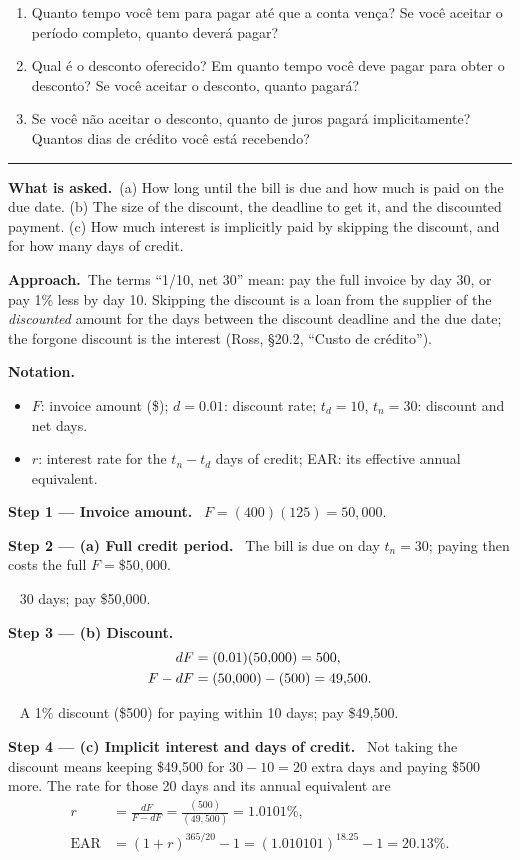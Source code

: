 \documentclass[11pt,a4paper]{article}
\newcommand{\notation}{\par\noindent\textbf{Notation.}}
\newcommand{\step}[2]{\par\medskip\noindent\textbf{Step #1 --- #2.}~}
\newcommand{\asked}{\par\medskip\noindent\textbf{What is asked.}~}
\newcommand{\approach}{\par\smallskip\noindent\textbf{Approach.}~}
\newcommand{\answer}[1]{\par\smallskip\noindent\fbox{\textbf{Answer #1.}}~}
\newcommand{\stmtend}{\par\endgroup\nopagebreak\noindent\rule{\linewidth}{0.4pt}\par\medskip}
\begin{document}
\begin{enumerate}
\def\labelenumi{\alph{enumi}.}
\item
  Quanto tempo você tem para pagar até que a conta vença? Se você aceitar o período completo, quanto
  deverá pagar?
\item
  Qual é o desconto oferecido? Em quanto tempo você deve pagar para obter o desconto? Se você
  aceitar o desconto, quanto pagará?
\item
  Se você não aceitar o desconto, quanto de juros pagará implicitamente? Quantos dias de crédito
  você está recebendo?
\end{enumerate}
\stmtend

\asked (a) How long until the bill is due and how much is paid on the due date. (b) The size of
the discount, the deadline to get it, and the discounted payment. (c) How much interest is
implicitly paid by skipping the discount, and for how many days of credit.

\approach The terms ``1/10, net 30'' mean: pay the full invoice by day 30, or pay 1\% less by day
10. Skipping the discount is a loan from the supplier of the \emph{discounted} amount for the
days between the discount deadline and the due date; the forgone discount is the interest (Ross,
\S20.2, ``Custo de cr\'edito'').

\notation
\begin{itemize}
  \item $F$: invoice amount (\$); $d = 0.01$: discount rate; $t_d = 10$, $t_n = 30$: discount and net days.
  \item $r$: interest rate for the $t_n - t_d$ days of credit; EAR: its effective annual equivalent.
\end{itemize}

\step{1}{Invoice amount}
$F = (400)(125) = 50{,}000$.

\step{2}{(a) Full credit period}
The bill is due on day $t_n = 30$; paying then costs the full $F = \$50{,}000$.

\answer{(a)} 30 days; pay \$50{,}000.

\step{3}{(b) Discount}
\begin{align}
  dF &= (0.01)(50{,}000) = 500, \notag\\
  F - dF &= (50{,}000) - (500) = 49{,}500. \notag
\end{align}

\answer{(b)} A 1\% discount (\$500) for paying within 10 days; pay \$49{,}500.

\step{4}{(c) Implicit interest and days of credit}
Not taking the discount means keeping \$49{,}500 for $30-10 = 20$ extra days and paying \$500
more. The rate for those 20 days and its annual equivalent are
\begin{align}
  r &= \frac{dF}{F - dF} = \frac{(500)}{(49{,}500)} = 1.0101\%, \label{r5be3-r}\\
  \text{EAR} &= (1+r)^{365/20} - 1 = (1.010101)^{18.25} - 1 = 20.13\%. \label{r5be3-ear}
\end{align}
\end{document}
